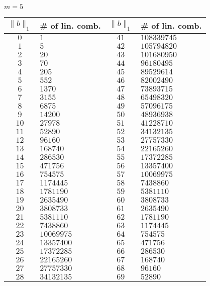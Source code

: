\documentclass{article}
\newcommand\norm[1]{\lVert#1\rVert}
\begin{document}
    \begin{minipage}{0.48\textwidth}
    $m=5$
    \vspace{12pt}
    \small
    
        \begin{tabular}{c|l||c|l}
$\norm{b}_1$ & {\# of lin. comb.} & $\norm{b}_1$ & {\# of lin. comb.}  \\
\hline
$0$ & $1$ & $41$ & $108339745$ \\
$1$ & $5$ & $42$ & $105794820$ \\
$2$ & $20$ & $43$ & $101680950$ \\
$3$ & $70$ & $44$ & $96180495$ \\
$4$ & $205$ & $45$ & $89529614$ \\
$5$ & $552$ & $46$ & $82002490$ \\
$6$ & $1370$ & $47$ & $73893715$ \\
$7$ & $3155$ & $48$ & $65498320$ \\
$8$ & $6875$ & $49$ & $57096175$ \\
$9$ & $14200$ & $50$ & $48936938$ \\
$10$ & $27978$ & $51$ & $41228710$ \\
$11$ & $52890$ & $52$ & $34132135$ \\
$12$ & $96160$ & $53$ & $27757330$ \\
$13$ & $168740$ & $54$ & $22165260$ \\
$14$ & $286530$ & $55$ & $17372285$ \\
$15$ & $471756$ & $56$ & $13357400$ \\
$16$ & $754575$ & $57$ & $10069975$ \\
$17$ & $1174445$ & $58$ & $7438860$ \\
$18$ & $1781190$ & $59$ & $5381110$ \\
$19$ & $2635490$ & $60$ & $3808733$ \\
$20$ & $3808733$ & $61$ & $2635490$ \\
$21$ & $5381110$ & $62$ & $1781190$ \\
$22$ & $7438860$ & $63$ & $1174445$ \\
$23$ & $10069975$ & $64$ & $754575$ \\
$24$ & $13357400$ & $65$ & $471756$ \\
$25$ & $17372285$ & $66$ & $286530$ \\
$26$ & $22165260$ & $67$ & $168740$ \\
$27$ & $27757330$ & $68$ & $96160$ \\
$28$ & $34132135$ & $69$ & $52890$ \\

\end{tabular}
\end{minipage}
\end{document}
